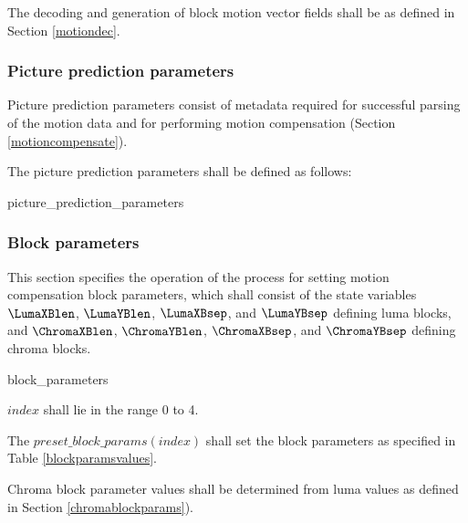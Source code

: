 The decoding and generation of block motion vector fields shall be as defined in Section \ref{motiondec}. 

\subsubsection{Picture prediction parameters}
\label{picpredparams}

Picture prediction parameters consist of metadata required for successful parsing of the
motion data and for performing motion compensation (Section \ref{motioncompensate}).

The picture prediction parameters shall be defined as follows:

\begin{pseudo}{picture\_prediction\_parameters}{}
\end{pseudo}

\subsubsection{Block parameters}
\label{blockparameters}

This section specifies the operation of the process for
setting motion compensation block parameters, which shall consist of the state variables
$\LumaXBlen$, $\LumaYBlen$, $\LumaXBsep$, and $\LumaYBsep$
defining luma blocks, and $\ChromaXBlen$, $\ChromaYBlen$, $\ChromaXBsep$,
and $\ChromaYBsep$ defining chroma blocks. 

\begin{pseudo}{block\_parameters}{}
\bsELSE
\bsEND
{}
\end{pseudo}

$index$ shall lie in the range 0 to 4. 

The $preset\_block\_params(index)$ shall set the block parameters as specified
in Table \ref{blockparamsvalues}.

Chroma block parameter values shall be determined from luma values
as defined in Section \ref{chromablockparams}).

